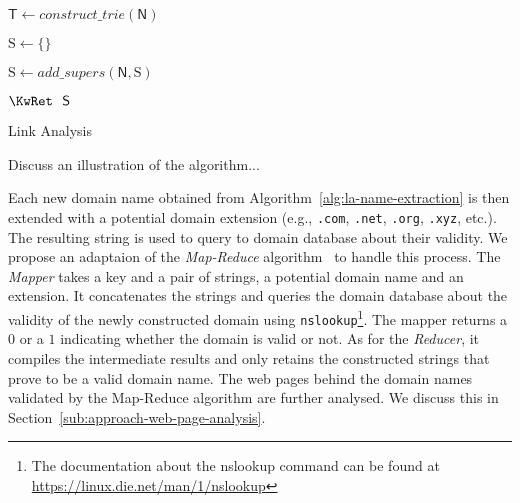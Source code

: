 
\begin{algorithm}[pht!]
    \DontPrintSemicolon

    $\mathsf{T} \gets \mathit{construct\_trie}(\mathsf{N})$\;

    $\mathrm{S} \gets \{\}$\;

    
    $\mathrm{S}\gets\mathit{add\_supers}(\mathsf{N}, \mathrm{S})$\;

    $\KwRet~~\mathsf{S}$\;

    \;

\caption{Link Analysis}
\label{alg:la-name-extraction}
\end{algorithm}

Discuss an illustration of the algorithm...

Each new domain name obtained from Algorithm~\ref{alg:la-name-extraction} is then extended with a potential domain extension (e.g., {\texttt{.com}}, {\texttt{.net}}, {\texttt{.org}}, {\texttt{.xyz}}, etc.). The resulting string is used to query to domain database about their validity. We propose an adaptaion of the \emph{Map-Reduce} algorithm~\cite{dean-dhemawhat:2008} to handle this process. The \emph{Mapper} takes a key and a pair of strings, a potential domain name and an extension. It concatenates the strings and queries the domain database about the validity of the newly constructed domain using {\texttt{nslookup}}\footnote{The documentation about the nslookup command can be found at \url{https://linux.die.net/man/1/nslookup}}. The mapper returns a $0$ or a $1$ indicating whether the domain is valid or not. As for the \emph{Reducer}, it compiles the intermediate results and only retains the constructed strings that prove to be a valid domain name. The web pages behind the domain names validated by the Map-Reduce algorithm are further  analysed. We discuss this in Section~\ref{sub:approach-web-page-analysis}.

